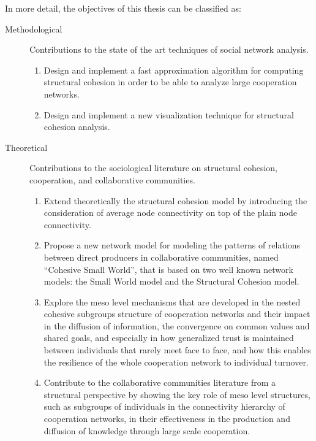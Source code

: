 In more detail, the objectives of this thesis can be classified as:

\begin{description}

\item[Methodological] Contributions to the state of the art techniques of social network analysis.

\begin{enumerate}

\item Design and implement a fast approximation algorithm for computing structural cohesion in order to be able to analyze large cooperation networks.

\item Design and implement a new visualization technique for structural cohesion analysis.

\end{enumerate}

\item[Theoretical] Contributions to the sociological literature on structural cohesion, cooperation, and collaborative communities.

\begin{enumerate}

\item Extend theoretically the structural cohesion model by introducing the consideration of average node connectivity on top of the plain node connectivity. 

\item Propose a new network model for modeling the patterns of relations between direct producers in collaborative communities, named ``Cohesive Small World'', that is based on two well known network models: the Small World model and the Structural Cohesion model. 

\item Explore the meso level mechanisms that are developed in the nested cohesive subgroups structure of cooperation networks and their impact in the diffusion of information, the convergence on common values and shared goals, and especially in how generalized trust is maintained between individuals that rarely meet face to face, and how this enables the resilience of the whole cooperation network to individual turnover.

\item Contribute to the collaborative communities literature from a structural perspective by showing the key role of meso level structures, such as subgroups of individuals in the connectivity hierarchy of cooperation networks, in their effectiveness in the production and diffusion of knowledge through large scale cooperation. 


\end{enumerate}
\end{description}
